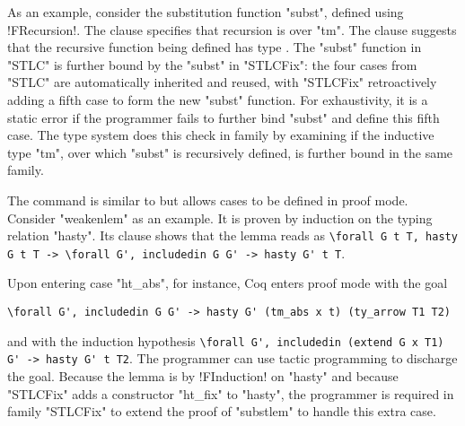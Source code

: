 As an example, consider the substitution function "subst", defined using
\lsti!FRecursion!.
The  clause specifies that recursion is over "tm".
The  clause suggests that the recursive function being
defined has type .
%
The "subst" function in "STLC" is further bound by the "subst" in "STLCFix":
the four cases from "STLC" are automatically inherited and reused,
with "STLCFix" retroactively adding a fifth case to form the new "subst" function.
%
For exhaustivity, it is a static error if the programmer fails to
further bind "subst" and define this fifth case.
The type system does this check in family 
by examining if the inductive type "tm",
over which "subst" is recursively defined, is further bound in the same family.

The  command is similar to  but
allows cases to be defined in proof mode.
Consider "weakenlem" as an example.
It is proven by induction on the typing relation "hasty".
Its  clause shows that the lemma reads as
\lstinline[basicstyle=\fontsize{8}{9}\ttfamily]!\forall G t T, hasty G t T -> \forall G', includedin G G' -> hasty G' t T!.


\noindent
Upon entering case "ht_abs", for instance, Coq enters proof mode with the goal

\begin{centered}
\begin{minipage}{.635\textwidth}
\begin{lstlisting}[basicstyle=\fontsize{8}{9}\ttfamily]
\forall G', includedin G G' -> hasty G' (tm_abs x t) (ty_arrow T1 T2)
\end{lstlisting}
\end{minipage}
\end{centered}

\noindent
and with the induction hypothesis
\lstinline[basicstyle=\fontsize{8}{9}\ttfamily]!\forall G', includedin (extend G x T1) G' -> hasty G' t T2!.
%
The programmer can use tactic programming to discharge the goal.
Because the lemma is by \lsti!FInduction! on "hasty" and because "STLCFix" adds
a constructor "ht_fix" to "hasty", the programmer is required in family "STLCFix" to
extend the proof of "substlem" to handle this extra case.


